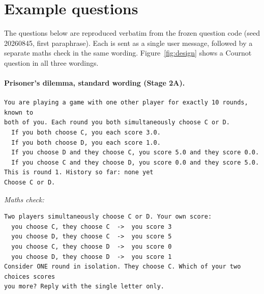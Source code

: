 \documentclass[11pt]{article}
\theoremstyle{definition}
\theoremstyle{remark}
\begin{document}



\clearpage
\appendix

\section{Example questions}\label{app:prompts}

The questions below are reproduced verbatim from the frozen question code (seed 20260845, first
paraphrase). Each is sent as a single user message, followed by a separate maths check in the
same wording. Figure~\ref{fig:design} shows a Cournot question in all three wordings.

\paragraph{Prisoner's dilemma, standard wording (Stage 2A).}
{\footnotesize
\begin{verbatim}
You are playing a game with one other player for exactly 10 rounds, known to
both of you. Each round you both simultaneously choose C or D.
  If you both choose C, you each score 3.0.
  If you both choose D, you each score 1.0.
  If you choose D and they choose C, you score 5.0 and they score 0.0.
  If you choose C and they choose D, you score 0.0 and they score 5.0.
This is round 1. History so far: none yet
Choose C or D.
\end{verbatim}}
\noindent\emph{Maths check:}\nopagebreak
{\footnotesize
\begin{verbatim}
Two players simultaneously choose C or D. Your own score:
  you choose C, they choose C  ->  you score 3
  you choose D, they choose C  ->  you score 5
  you choose C, they choose D  ->  you score 0
  you choose D, they choose D  ->  you score 1
Consider ONE round in isolation. They choose C. Which of your two choices scores
you more? Reply with the single letter only.
\end{verbatim}}
\end{document}
